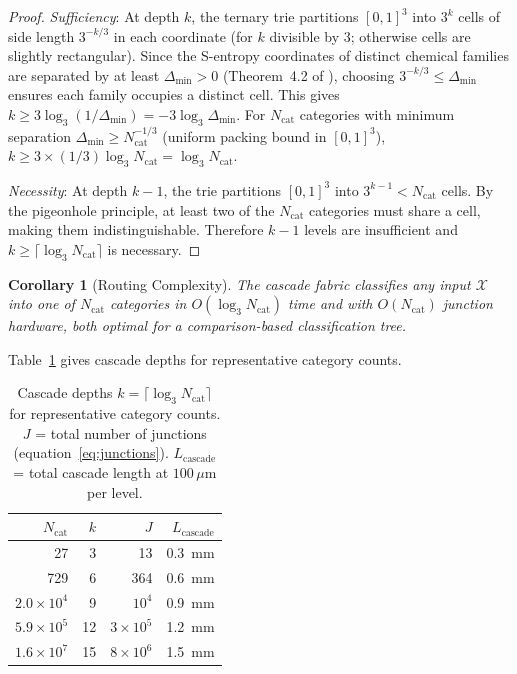 \documentclass[11pt,twocolumn,a4paper]{article}
\newtheorem{corollary}[theorem]{Corollary}
\theoremstyle{remark}
\begin{document}
\begin{proof}
\textit{Sufficiency}: At depth $k$, the ternary trie partitions $[0,1]^3$
into $3^k$ cells of side length $3^{-k/3}$ in each coordinate
(for $k$ divisible by 3; otherwise cells are slightly rectangular).
Since the S-entropy coordinates of distinct chemical families are separated by
at least $\Delta_{\min} > 0$ (Theorem~4.2 of \citep{companion2}), choosing
$3^{-k/3} \leq \Delta_{\min}$ ensures each family occupies a distinct cell.
This gives $k \geq 3\log_3(1/\Delta_{\min}) = -3\log_3 \Delta_{\min}$.
For $N_{\mathrm{cat}}$ categories with minimum separation $\Delta_{\min} \geq
N_{\mathrm{cat}}^{-1/3}$ (uniform packing bound in $[0,1]^3$),
$k \geq 3 \times (1/3) \log_3 N_{\mathrm{cat}} = \log_3 N_{\mathrm{cat}}$.

\textit{Necessity}: At depth $k-1$, the trie partitions $[0,1]^3$ into $3^{k-1}
< N_{\mathrm{cat}}$ cells. By the pigeonhole principle, at least two of the
$N_{\mathrm{cat}}$ categories must share a cell, making them indistinguishable.
Therefore $k-1$ levels are insufficient and $k \geq \lceil\log_3 N_{\mathrm{cat}}\rceil$
is necessary.
\end{proof}

\begin{corollary}[Routing Complexity]
\label{cor:routing}
The cascade fabric classifies any input $\mathcal{X}$ into one of $N_{\mathrm{cat}}$
categories in $O(\log_3 N_{\mathrm{cat}})$ time and with $O(N_{\mathrm{cat}})$
junction hardware, both optimal for a comparison-based classification tree.
\end{corollary}

Table~\ref{tab:depth} gives cascade depths for representative category counts.

\begin{table}[h]
\centering
\small
\caption{Cascade depths $k = \lceil\log_3 N_{\mathrm{cat}}\rceil$ for
representative category counts. $J$ = total number of junctions (equation~\eqref{eq:junctions}).
$L_{\mathrm{cascade}}$ = total cascade length at $100\,\mu$m per level.}
\label{tab:depth}
\begin{tabular}{r r r r}
\toprule
$N_{\mathrm{cat}}$ & $k$ & $J$ & $L_{\mathrm{cascade}}$ \\
\midrule
27            & 3  & 13     & 0.3~mm \\
729           & 6  & 364    & 0.6~mm \\
$2.0\times10^4$ & 9  & $10^4$ & 0.9~mm \\
$5.9\times10^5$ & 12 & $3\times10^5$ & 1.2~mm \\
$1.6\times10^7$ & 15 & $8\times10^6$ & 1.5~mm \\
\bottomrule
\end{tabular}
\end{table}
\end{document}
